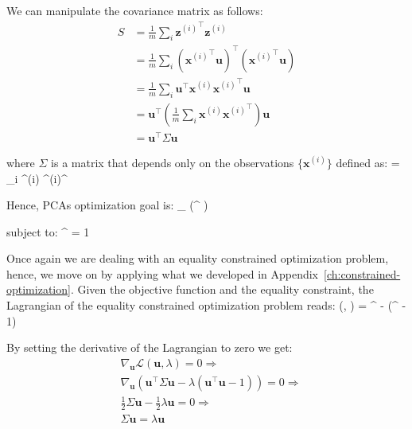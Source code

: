 We can manipulate the covariance matrix as follows:
{\setlength{\jot}{5pt}
\begin{align*}
S & = \frac{1}{m} \sum_{i} {\boldsymbol{z}^{(i)}}^{\intercal} \boldsymbol{z}^{(i)} \\
&= \frac{1}{m} \sum_{i} \left( {\boldsymbol{x}^{(i)}}^{\intercal} \boldsymbol{u} \right)^{\intercal} 
\left({\boldsymbol{x}^{(i)}}^{\intercal} \boldsymbol{u} \right) \\
&= \frac{1}{m} \sum_{i} \boldsymbol{u}^{\intercal} \boldsymbol{x}^{(i)} 
{\boldsymbol{x}^{(i)}}^{\intercal} \boldsymbol{u} \\
&= \boldsymbol{u}^{\intercal} \left( \frac{1}{m} \sum_{i} \boldsymbol{x}^{(i)} 
{\boldsymbol{x}^{(i)}}^{\intercal} \right) \boldsymbol{u} \\
&= \boldsymbol{u}^{\intercal} \Sigma \boldsymbol{u}
\end{align*}}

\vspace{-10pt}

where $\Sigma$ is a matrix that depends only on the observations $\{\boldsymbol{x}^{(i)}\}$ defined as:
\bse
\Sigma =  \sum_{i} ^{(i)} {^{(i)}}^{\intercal}
\ese

Hence, PCAs optimization goal is:
\bse
\max_{} \left(^{\intercal} \Sigma {}\right)
\ese

subject to:
\bse
{}^{\intercal}  = 1
\ese

Once again we are dealing with an equality constrained optimization problem, hence, we move on by applying what we
developed in Appendix~\ref{ch:constrained-optimization}. Given the objective function and the equality constraint, 
the Lagrangian of the equality constrained optimization problem reads:
\bse
{}(, \lambda) = ^{\intercal} \Sigma {} - 
\lambda (^{\intercal}  - 1)
\ese

By setting the derivative of the Lagrangian to zero we get:
{\setlength{\jot}{10pt}
\begin{align*}
& \nabla_{\boldsymbol{u}} \mathcal{L}(\boldsymbol{u}, \lambda) = 0 \Rightarrow \\
& \nabla_{\boldsymbol{u}} \left( \boldsymbol{u}^{\intercal} \Sigma \boldsymbol{u} 
- \lambda (\boldsymbol{u}^{\intercal} \boldsymbol{u} - 1) \right) = 0 \Rightarrow \\
& \frac{1}{2} \Sigma \boldsymbol{u} - \frac{1}{2} \lambda \boldsymbol{u} = 0 \Rightarrow \\
& \Sigma \boldsymbol{u} = \lambda \boldsymbol{u}
\end{align*}}

